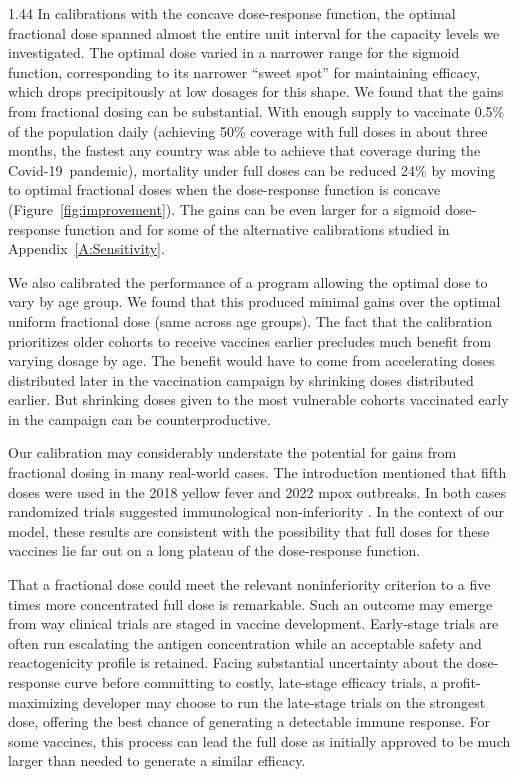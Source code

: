 \documentclass[12pt]{article}
\newcommand{\covid}{Covid-19}
\begin{document}
\begin{spacing}{1.44}
In calibrations with the concave dose-response function, the optimal
fractional dose spanned almost the entire unit interval for the
capacity levels we investigated. The optimal dose varied in a narrower
range for the sigmoid function, corresponding to its narrower ``sweet
spot'' for maintaining efficacy, which drops precipitously at low
dosages for this shape. We found that the gains from fractional dosing
can be substantial.  With enough supply to vaccinate 0.5\% of the
population daily (achieving 50\% coverage with full doses in about
three months, the fastest any country was able to achieve that
coverage during the \covid\ pandemic), mortality under full doses can
be reduced 24\% by moving to optimal fractional doses when the
dose-response function is concave (Figure~\ref{fig:improvement}).
The gains can be even larger for a
sigmoid dose-response function and for some of the alternative
calibrations studied in Appendix~\ref{A:Sensitivity}.

We also calibrated the performance of a program allowing the optimal
dose to vary by age group.  We found that this produced minimal gains
over the optimal uniform fractional dose (same across age groups). The
fact that the calibration prioritizes older cohorts to receive
vaccines earlier precludes much benefit from varying dosage by
age. The benefit would have to come from accelerating doses
distributed later in the vaccination campaign by shrinking doses
distributed earlier. But shrinking doses given to the most vulnerable
cohorts vaccinated early in the campaign can be counterproductive.

Our calibration may considerably understate the potential for gains
from fractional dosing in many real-world cases. The introduction
mentioned that fifth doses were used in the 2018 yellow fever and 2022
mpox outbreaks. In both cases randomized trials suggested
immunological non-inferiority \citep{JuanGiner2021,
  CDC2026MpoxVaccine}. In the context of our model, these results are consistent with the possibility that full doses for these vaccines lie far out on a long plateau
of the dose-response function. 

That a fractional dose could meet the relevant noninferiority criterion to a five times more concentrated full dose is remarkable. Such an outcome may emerge from way
clinical trials are staged in vaccine development. Early-stage trials
are often run escalating the antigen concentration while an acceptable
safety and reactogenicity profile is retained. Facing substantial
uncertainty about the dose-response curve before committing to costly,
late-stage efficacy trials, a profit-maximizing developer may choose
to run the late-stage trials on the strongest dose, offering the best
chance of generating a detectable immune response. For some vaccines,
this process can lead the full dose as initially approved to be much
larger than needed to generate a similar efficacy.


\end{spacing}
\end{document}
